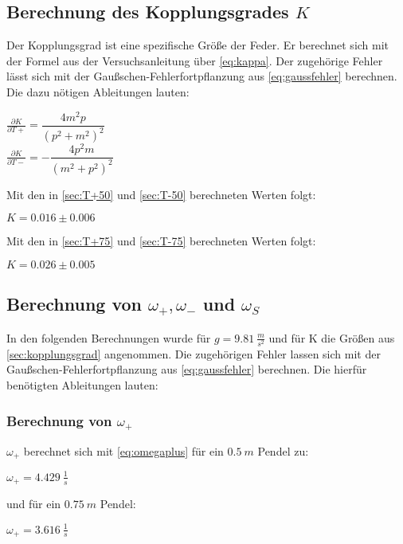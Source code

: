 \subsection{Berechnung des Kopplungsgrades $K$}
\label{sec:kopplungsgrad}
Der Kopplungsgrad ist eine spezifische Größe der Feder.
Er berechnet sich mit der Formel aus der Versuchsanleitung
über \autoref{eq:kappa}. Der zugehörige Fehler lässt sich mit der Gaußschen-Fehlerfortpflanzung aus 
\autoref{eq:gaussfehler} berechnen. Die dazu nötigen Ableitungen lauten:
\begin{center}
  


  $\frac{\partial K}{\partial T+}=\dfrac{4m^2p}{\left(p^2+m^2\right)^2}$\\
  $\frac{\partial K}{\partial T-}=-\dfrac{4p^2m}{\left(m^2+p^2\right)^2}$
\end{center}
Mit den in \autoref{sec:T+50} und \autoref{sec:T-50} berechneten Werten folgt:
\begin{center}
  $K=0.016\pm0.006$
\end{center}
Mit den in \autoref{sec:T+75} und \autoref{sec:T-75} berechneten Werten folgt:

\begin{center}
  $K=0.026\pm0.005$
\end{center}

\subsection{Berechnung von $\omega_+, \omega_-$ und $\omega_S$}
In den folgenden Berechnungen wurde für $g=\SI{9,81}{\frac{m}{s^2}}$ und für K die Größen aus
\autoref{sec:kopplungsgrad} angenommen. Die zugehörigen Fehler lassen sich mit der 
Gaußschen-Fehlerfortpflanzung aus \autoref{eq:gaussfehler} berechnen.
Die hierfür benötigten Ableitungen lauten:
\begin{center}
  
\end{center}
\subsubsection{Berechnung von $\omega_+$}
$\omega_+$ berechnet sich mit \autoref{eq:omegaplus} für ein $\SI{0,5}{m}$ Pendel zu:
\begin{center}
  $\omega_+=\SI{4.429}{\frac{1}{s}}$
\end{center}
und für ein $\SI{0,75}{m}$ Pendel:
\begin{center}
  $\omega_+=\SI{3.616}{\frac{1}{s}}$
\end{center}
